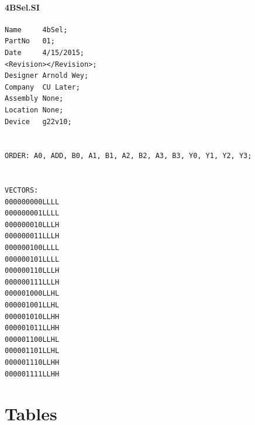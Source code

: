 \documentclass[letterpaper,titlepage,oneside]{article}
\begin{document}
\paragraph*{4BSel.SI}
\label{code: 4BSelSi}
\begin{lstlisting}
Name     4bSel;
PartNo   01;
Date     4/15/2015;
<Revision></Revision>;
Designer Arnold Wey;
Company  CU Later;
Assembly None;
Location None;
Device   g22v10;


ORDER: A0, ADD, B0, A1, B1, A2, B2, A3, B3, Y0, Y1, Y2, Y3; 


VECTORS:
000000000LLLL
000000001LLLL
000000010LLLH
000000011LLLH
000000100LLLL
000000101LLLL
000000110LLLH
000000111LLLH
000001000LLHL
000001001LLHL
000001010LLHH
000001011LLHH
000001100LLHL
000001101LLHL
000001110LLHH
000001111LLHH
\end{lstlisting}


\pagebreak
\section{Tables}
\end{document}
